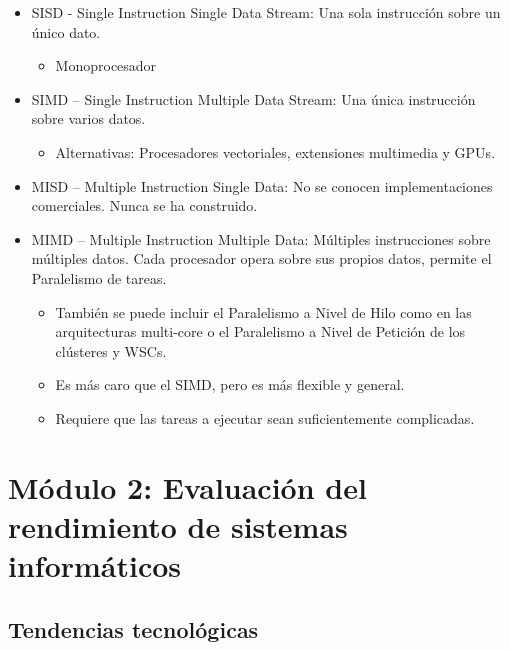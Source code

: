 \documentclass[12pt, twoside, openright]{report} %
\begin{document}
  \begin{itemize}
  
  \item
    SISD - Single Instruction Single Data Stream: Una sola instrucción
    sobre un único dato.

    \begin{itemize}
    
    \item
      Monoprocesador
    \end{itemize}
  \item
    SIMD -- Single Instruction Multiple Data Stream: Una única
    instrucción sobre varios datos.

    \begin{itemize}
    
    \item
      Alternativas: Procesadores vectoriales, extensiones multimedia y
      GPUs.
    \end{itemize}
  \item
    MISD -- Multiple Instruction Single Data: No se conocen
    implementaciones comerciales. Nunca se ha construido.
  \item
    MIMD -- Multiple Instruction Multiple Data: Múltiples instrucciones
    sobre múltiples datos. Cada procesador opera sobre sus propios
    datos, permite el Paralelismo de tareas.

    \begin{itemize}
    
    \item
      También se puede incluir el Paralelismo a Nivel de Hilo como en
      las arquitecturas multi-core o el Paralelismo a Nivel de Petición
      de los clústeres y WSCs.
    \item
      Es más caro que el SIMD, pero es más flexible y general.
    \item
      Requiere que las tareas a ejecutar sean suficientemente
      complicadas.
    \end{itemize}
  \end{itemize}

  \chapter{Módulo 2: Evaluación del rendimiento de sistemas informáticos}
  \section{Tendencias tecnológicas}
\end{document}
